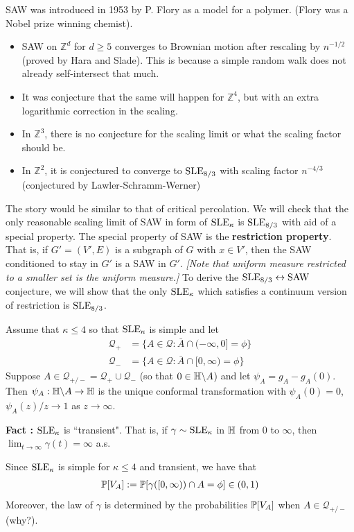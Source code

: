 \documentclass[12pt,a4paper]{article}
\renewenvironment{i}
{\begin{itemize} 
	}%
	{\end{itemize}
}
\begin{document}
\quad SAW was introduced in 1953 by P. Flory as a model for a polymer. (Flory was a Nobel prize winning chemist). 
\begin{i}
\item SAW on $\mathbb{Z}^d$ for $d\geq 5$ converges to Brownian motion after rescaling  by $n^{-1/2}$ (proved by Hara and Slade). This is because a simple random walk does not already self-intersect that much.
\item It was conjecture that the same will happen for $\mathbb{Z}^4$, but with an extra logarithmic correction in the scaling.
\item In $\mathbb{Z}^3$, there is no conjecture for the scaling limit or what the scaling factor should be.
\item In $\mathbb{Z}^2$, it is conjectured to converge to $\text{SLE}_{8/3}$ with scaling factor $n^{-4/3}$ (conjectured by Lawler-Schramm-Werner)
\end{i}
The story would be similar to that of critical percolation. We will check that the only reasonable scaling limit of SAW in form of $\text{SLE}_{\kappa}$ is $\text{SLE}_{8/3}$ with aid of a special property. The special property of SAW is the \textbf{restriction property}. That is, if $G' = (V', E)$ is a subgraph of $G$ with $x\in V'$, then the SAW conditioned to stay in $G'$ is a SAW in $G'$. \emph{[Note that uniform measure restricted to a smaller set is the uniform measure.]} To derive the $\text{SLE}_{8/3} \leftrightarrow \text{SAW}$ conjecture, we will show that the only $\text{SLE}_{\kappa}$ which satisfies a continuum version of restriction is $\text{SLE}_{8/3}$.

\quad Assume that $\kappa \leq 4$ so that $\text{SLE}_{\kappa}$ is simple and let
\begin{align*}
\mathscr{Q}_+ &= \{A\in \mathscr{Q} : \bar{A} \cap (-\infty, 0] = \phi \} \\
\mathscr{Q}_- &= \{A\in \mathscr{Q} : \bar{A} \cap [0, \infty) = \phi \}
\end{align*}
Suppose $A\in \mathscr{Q}_{+/-} = \mathscr{Q}_+ \cup \mathscr{Q}_-$ (so that $0\in \mathbb{H} \backslash A$) and let $\psi_A = g_A - g_A(0)$. Then $\psi_A : \mathbb{H} \backslash A \rightarrow \mathbb{H}$ is the unique conformal transformation with $\psi_A(0)=0$, $\psi_A(z)/z \rightarrow 1$ as $z\rightarrow \infty$.
\s

\textbf{Fact :} $\text{SLE}_{\kappa}$ is ``transient". That is, if $\gamma \sim \text{SLE}_{\kappa}$ in $\mathbb{H}$ from 0 to $\infty$, then $\lim_{t\rightarrow \infty} \gamma(t) =\infty$ a.s. 
\s

Since $\text{SLE}_{\kappa}$ is simple for $\kappa\leq 4$ and transient, we have that 
\begin{align*}
\mathbb{P}[V_A] := \mathbb{P} [\gamma([0, \infty)) \cap A  = \phi] \in (0,1) 
\end{align*}
Moreover, the law of $\gamma$ is determined by the probabilities $\mathbb{P}[V_A]$ when $A\in \mathscr{Q}_{+/-}$ (why?).
\s
\end{document}
